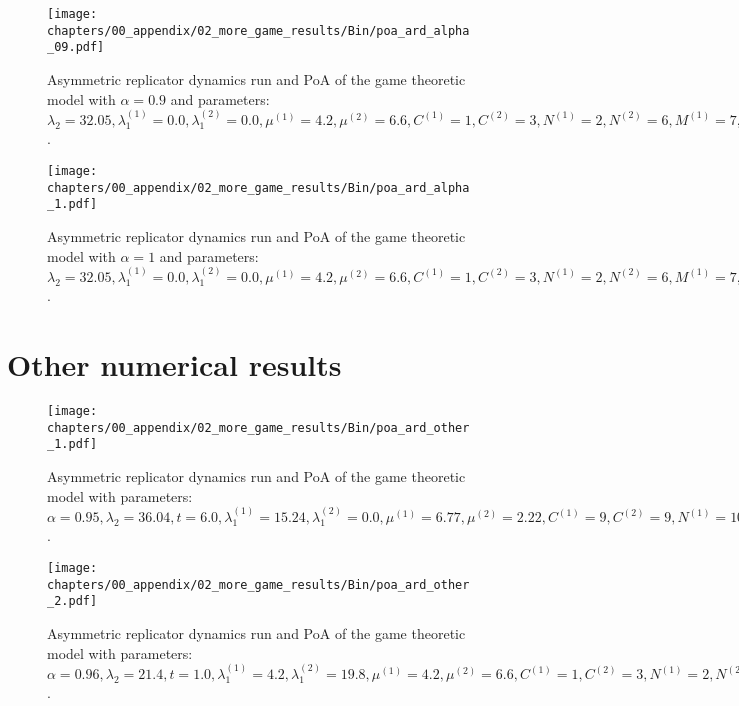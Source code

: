 \begin{figure}[H]
    \texttt{[image: chapters/00\_appendix/02\_more\_game\_results/Bin/poa\_ard\_alpha\_09.pdf]}
    \caption{Asymmetric replicator dynamics run and PoA of the game theoretic
    model with \(\alpha = 0.9\) and parameters: \(\lambda_2 = 32.05,
    \lambda_1^{(1)} = 0.0, \lambda_1^{(2)} = 0.0, \mu^{(1)} = 4.2,
    \mu^{(2)} = 6.6, C^{(1)} = 1, C^{(2)} = 3, N^{(1)} = 2, N^{(2)} = 6,
    M^{(1)} = 7, M^{(2)} = 4, t = 2.0\).}
    \label{fig:poa_ard_alpha_09}
\end{figure}



\begin{figure}[H]
    \texttt{[image: chapters/00\_appendix/02\_more\_game\_results/Bin/poa\_ard\_alpha\_1.pdf]}
    \caption{Asymmetric replicator dynamics run and PoA of the game theoretic
    model with \(\alpha = 1\) and parameters: \(\lambda_2 = 32.05,
    \lambda_1^{(1)} = 0.0, \lambda_1^{(2)} = 0.0, \mu^{(1)} = 4.2,
    \mu^{(2)} = 6.6, C^{(1)} = 1, C^{(2)} = 3, N^{(1)} = 2, N^{(2)} = 6,
    M^{(1)} = 7, M^{(2)} = 4, t = 2.0\).}
    \label{fig:poa_ard_alpha_1}
\end{figure}


\section{Other numerical results}


\begin{figure}[H]
    \texttt{[image: chapters/00\_appendix/02\_more\_game\_results/Bin/poa\_ard\_other\_1.pdf]}
    \caption{Asymmetric replicator dynamics run and PoA of the game theoretic
    model with parameters: \(\alpha = 0.95, \lambda_2 = 36.04, t = 6.0,
    \lambda_1^{(1)} = 15.24, \lambda_1^{(2)} = 0.0, \mu^{(1)} = 6.77,
    \mu^{(2)} = 2.22, C^{(1)} = 9, C^{(2)} = 9, N^{(1)} = 10, N^{(2)} = 9,
    M^{(1)} = 4, M^{(2)} = 3\).}
    \label{fig:poa_ard_other_1}
\end{figure}


\begin{figure}[H]
    \texttt{[image: chapters/00\_appendix/02\_more\_game\_results/Bin/poa\_ard\_other\_2.pdf]}
    \caption{Asymmetric replicator dynamics run and PoA of the game theoretic
    model with parameters: \(\alpha = 0.96, \lambda_2 = 21.4, t = 1.0,
    \lambda_1^{(1)} = 4.2, \lambda_1^{(2)} = 19.8, \mu^{(1)} = 4.2,
    \mu^{(2)} = 6.6, C^{(1)} = 1, C^{(2)} = 3, N^{(1)} = 2, N^{(2)} = 6,
    M^{(1)} = 7, M^{(2)} = 4\).}
    \label{fig:poa_ard_other_2}
\end{figure}


